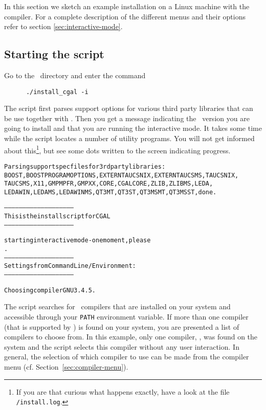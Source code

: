 In this section we sketch an example installation on a Linux machine
with the  compiler. For a complete description of the
different menus and their options refer to section
\ref{sec:interactive-mode}.

\subsection{Starting the script}

Go to the \cgaldir\ directory and enter the command
\begin{verbatim}
      ./install_cgal -i
\end{verbatim}

The script first parses support options for various third party
libraries that can be use together with \cgal. Then you get a message
indicating the \cgal\ version you are going to install and that you
are running the interactive mode. It takes some time while the script
locates a number of utility programs. You will not get informed about
this\footnote{If you are that curious what happens exactly, have a
  look at the file
  \texttt{\cgaldir/install.log}.}, but see some
dots written to the screen indicating progress.

{\ccTexHtml{\scriptsize}{}
\begin{alltt}
Parsing support specfiles for 3rd party libraries:
BOOST, BOOSTPROGRAMOPTIONS, EXTERNTAUCSNIX, EXTERNTAUCSMS, TAUCSNIX,
TAUCSMS, X11, GMPMPFR, GMPXX, CORE, CGALCORE, ZLIB, ZLIBMS, LEDA, 
LEDAWIN, LEDAMS, LEDAWINMS, QT3MT, QT3ST, QT3MSMT, QT3MSST, done.

--------------------------------------------------------
  This is the install script for CGAL \cgalrelease
--------------------------------------------------------

starting interactive mode - one moment, please
.
--------------------------------------------------------
Settings from Command Line/Environment:
--------------------------------------------------------

  Choosing compiler GNU 3.4.5.
\end{alltt}}
  
The script searches for \CC\ compilers that are installed on your
system and accessible through your \texttt{PATH} environment variable.
If more than one compiler (that is supported by \cgal) is found on
your system, you are presented a list of compilers to choose from. In
this example, only one compiler, , was found on the system
and the script selects this compiler without any user interaction. In
general, the selection of which compiler to use can be made from the
compiler menu (cf. Section~\ref{sec:compiler-menu}).

